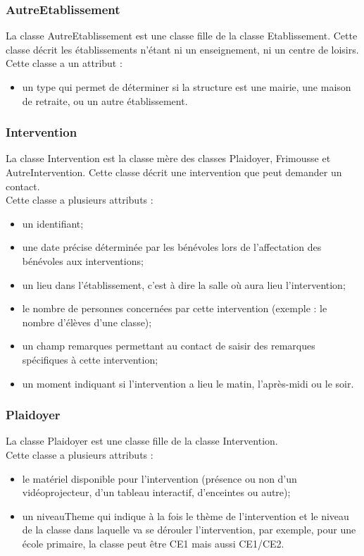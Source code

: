\subsubsection*{AutreEtablissement}
La classe AutreEtablissement est une classe fille de la classe Etablissement. Cette classe décrit les établissements n'étant ni un enseignement, ni un centre de loisirs. \\
Cette classe a un attribut : 
\begin{itemize}
\item un type qui permet de déterminer si la structure est une mairie, une maison de retraite, ou un autre établissement.
\end{itemize}  

\subsubsection*{Intervention}
La classe Intervention est la classe mère des classes Plaidoyer, Frimousse et AutreIntervention. Cette classe décrit une intervention que peut demander un contact. \\
Cette classe a plusieurs attributs :
\begin{itemize}
\item un identifiant;
\item une date précise déterminée par les bénévoles lors de l'affectation des bénévoles aux interventions;
\item un lieu dans l'établissement, c'est à dire la salle où aura lieu l'intervention;
\item le nombre de personnes concernées par cette intervention (exemple : le nombre d'élèves d'une classe);
\item un champ remarques permettant au contact de saisir des remarques spécifiques à cette intervention;
\item un moment indiquant si l'intervention a lieu le matin, l'après-midi ou le soir.
\end{itemize}

\subsubsection*{Plaidoyer}
La classe Plaidoyer est une classe fille de la classe Intervention. \\
Cette classe a plusieurs attributs : 
\begin{itemize}
\item le matériel disponible pour l'intervention (présence ou non d'un vidéoprojecteur, d'un tableau interactif, d'enceintes ou autre);
\item un niveauTheme qui indique à la fois le thème de l'intervention et le niveau de la classe dans laquelle va se dérouler l'intervention, par exemple, pour une école primaire, la classe peut être CE1 mais aussi CE1/CE2.
\end{itemize}

